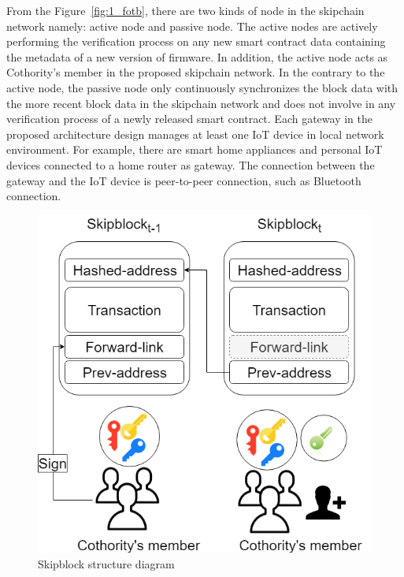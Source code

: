 From the Figure~\ref{fig:1_fotb}, there are two kinds of node in the skipchain network namely: active node and passive node. The active nodes are actively performing the verification process on any new smart contract data containing the metadata of a new version of firmware. In addition, the active node acts as Cothority's member in the proposed skipchain network. In the contrary to the active node, the passive node only continuously synchronizes the block data with the more recent block data in the skipchain network and does not involve in any verification process of a newly released smart contract. Each gateway in the proposed architecture design manages at least one IoT device in local network environment. For example, there are smart home appliances and personal IoT devices connected to a home router as gateway. The connection between the gateway and the IoT device is peer-to-peer connection, such as Bluetooth connection.

\begin{figure}[H]
	\begin{center}
		\includegraphics[width=1.0\textwidth]{figures/firmware_update-skipblock-diagram.png}
		\caption{Skipblock structure diagram} 
		\label{fig:skipblock_diagram}
	\end{center}
\end{figure}

